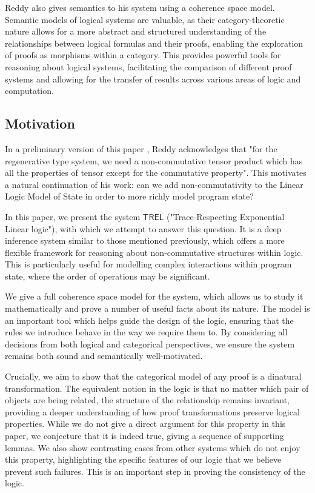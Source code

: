 \documentclass[11pt, oneside]{article}
\theoremstyle{plain}
\theoremstyle{definition}
\newcommand{\sSys}{{\mathsf{TREL}}}%
\begin{document}
Reddy also gives semantics to his system using a coherence space model.
Semantic models of logical systems are valuable, as their category-theoretic nature allows for a more abstract and structured understanding of the relationships between logical formulas and their proofs, enabling the exploration of proofs as morphisms within a category.
This provides powerful tools for reasoning about logical systems, facilitating the comparison of different proof systems and allowing for the transfer of results across various areas of logic and computation.

\subsection{Motivation}
In a preliminary version of this paper \cite{reddy1993linear}, Reddy acknowledges that "for the regenerative type system, we need a non-commutative tensor product which has all the properties of tensor except for the commutative property".
This motivates a natural continuation of his work: can we add non-commutativity to the Linear Logic Model of State in order to more richly model program state?

In this paper, we present the system $\sSys$ ("Trace-Respecting Exponential Linear logic"), with which we attempt to answer this question.
It is a deep inference system similar to those mentioned previously, which offers a more flexible framework for reasoning about non-commutative structures within logic.
This is particularly useful for modelling complex interactions within program state, where the order of operations may be significant.

We give a full coherence space model for the system, which allows us to study it mathematically and prove a number of useful facts about its nature.
The model is an important tool which helps guide the design of the logic, ensuring that the rules we introduce behave in the way we require them to.
By considering all decisions from both logical and categorical perspectives, we ensure the system remains both sound and semantically well-motivated.

Crucially, we aim to show that the categorical model of any proof is a dinatural transformation.
The equivalent notion in the logic is that no matter which pair of objects are being related, the structure of the relationship remains invariant, providing a deeper understanding of how proof transformations preserve logical properties.
While we do not give a direct argument for this property in this paper, we conjecture that it is indeed true, giving a sequence of supporting lemmas.
We also show contrasting cases from other systems which do not enjoy this property, highlighting the specific features of our logic that we believe prevent such failures.
This is an important step in proving the consistency of the logic.
\end{document}
